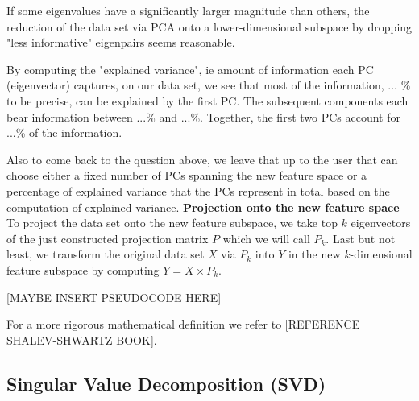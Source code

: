 \documentclass[journal, a4paper]{IEEEtran}
\begin{document}
If some eigenvalues have a significantly larger magnitude than others, the reduction of the data set via PCA onto a lower-dimensional subspace by dropping "less informative" eigenpairs seems reasonable.

By computing the "explained variance", ie amount of information each PC (eigenvector) captures, on our data set, we see that most of the information, ... \% to be precise, can be explained by the first PC. The subsequent components each bear information between ...\% and ...\%. Together, the first two PCs account for ...\% of the information.

Also to come back to the question above, we leave that up to the user that can choose either a fixed number of PCs spanning the new feature space or a percentage of explained variance that the PCs represent in total based on the computation of explained variance.
\newline
%
\textbf{Projection onto the new feature space}
To project the data set onto the new feature subspace, we take top \( k \) eigenvectors of the just constructed projection matrix \( P \) which we will call \( P_{k} \).
Last but not least, we transform the original data set \( X \) via \( P_{k} \) into \( Y \) in the new \(k\)-dimensional feature subspace by computing \( Y = X \times P_{k} \).

[MAYBE INSERT PSEUDOCODE HERE]

For a more rigorous mathematical definition we refer to [REFERENCE SHALEV-SHWARTZ BOOK].



\subsection{Singular Value Decomposition (SVD)}\label{svd}
\end{document}
